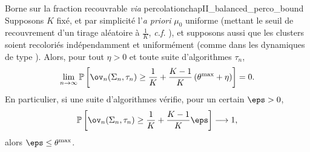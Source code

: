 \begin{Theoreme}{Borne sur la fraction recouvrable \emph{via} percolation}{chapII_balanced_perco_bound}
Supposons $K$ fixé, et par simplicité l'\emph{a priori} $\mu_0$ uniforme (mettant le seuil de recouvrement d'un tirage aléatoire à $\frac1K$, \emph{c.f.} ), et supposons aussi que les clusters soient recoloriés indépendamment et uniformément (comme dans les dynamiques de type \SW{}). Alors, pour tout $\eta>0$ et toute suite d'algorithmes $\tau_n$,
\begin{equation}
    \lim_{n\to\infty}
    \mathbb P\left[
        \ov_n(\Sigma_n,\tau_n)
        \ge
        \frac1K+\frac{K-1}{K}\left(\theta^{\max}+\eta\right)
    \right]
    =0.
    \label{eq:chapII_balanced_perco_bound_proba}
\end{equation}
En particulier, si une suite d'algorithmes vérifie, pour un certain $\eps>0$,
\begin{equation}
    \mathbb P\left[
        \ov_n(\Sigma_n,\tau_n)
        \ge
        \frac1K+\frac{K-1}{K}\eps
    \right]\longrightarrow1,
    \label{eq:chapII_eps_recovery}
\end{equation}
alors $\eps\le \theta^{\max}$. 
\end{Theoreme}

